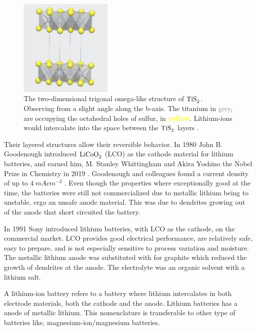 \begin{figure}[H]
    \centering
    \includegraphics[width=0.4\textwidth]{TiS2.png}
    \caption{The two-dimensional trigonal omega-like structure of $\ce{TiS_2}$. Observing from a slight angle along the b-axis. The titanium in \textcolor{gray}{grey}, are occupying the octahedral holes of sulfur, in \textcolor{yellow}{\textbf{yellow}}. Lithium-ions would intercalate into the space between the $\ce{TiS_2}$ layers \cite{materialsproject:TiS2}.}
    \label{fig:MPTiS2}
\end{figure}

Their layered structures allow their reversible behavior. In 1980 John B. Goodenough introduced $\ce{LiCoO_2}$ (\ac{LCO}) as the cathode material for lithium batteries, and earned him, M. Stanley Whittingham and Akira Yoshino the Nobel Prize in Chemistry in 2019 \cite{nobprize}. Goodenough and colleagues found a current density of up to $\SI{4}{mAcm^{-2}}$ \cite{mizushima1980lixcoo2} \cite{goodenough1980solid}. Even though the properties where exceptionally good at the time, the batteries were still not commercialized due to metallic lithium being to unstable, ergo an unsafe anode material. This was due to dendrites growing out of the anode that short circuited the battery. 

In 1991 Sony introduced lithium batteries, with LCO as the cathode, on the commercial market. LCO provides good electrical performance, are relatively safe, easy to prepare, and is not especially sensitive to process variation and moisture. The metallic lithium anode was substituted with for graphite which reduced the growth of dendrites at the anode. The electrolyte was an organic solvent with a lithium salt. 

A lithium-ion battery refers to a battery where lithium intercalates in both electrode materials, both the cathode and the anode. Lithium batteries has a anode of metallic lithium. This nomenclature is transferable to other type of batteries like, magnesium-ion/magnesium batteries. 

